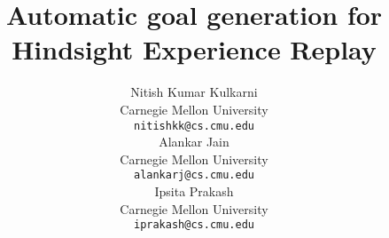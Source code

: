 \documentclass{article}
\title{Automatic goal generation for Hindsight Experience Replay}
\author{
  Nitish Kumar Kulkarni \\
  Carnegie Mellon University\\
  \texttt{nitishkk@cs.cmu.edu} \\
  \And
  Alankar Jain \\
  Carnegie Mellon University\\
  \texttt{alankarj@cs.cmu.edu} \\
  \And
  Ipsita Prakash\\
  Carnegie Mellon University\\
  \texttt{iprakash@cs.cmu.edu} \\
}
\begin{document}
\maketitle





{
  
  
}
\end{document}
